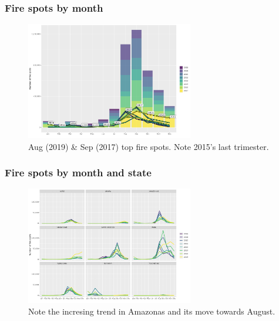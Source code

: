 \documentclass[aspectratio=169]{beamer}
\begin{document}

\begin{frame}
    \frametitle{Fire spots by month}
    \begin{figure}[h] 
        \includegraphics[width=0.65\textwidth] 
        {./figures/plot_fire_spots_by_month.png} 
        \caption{Aug (2019) \& Sep (2017) top fire spots. 
        Note 2015's last trimester.}
    \end{figure}
\end{frame}

\begin{frame}
    \frametitle{Fire spots by month and state}
    \begin{figure}[h]
        \includegraphics[width=0.65\textwidth]
        {./figures/plot_fire_spots_by_month_state.png}
        \caption{Note the incresing trend in Amazonas and its move towards
        August.}
    \end{figure}
\end{frame}
\end{document}
